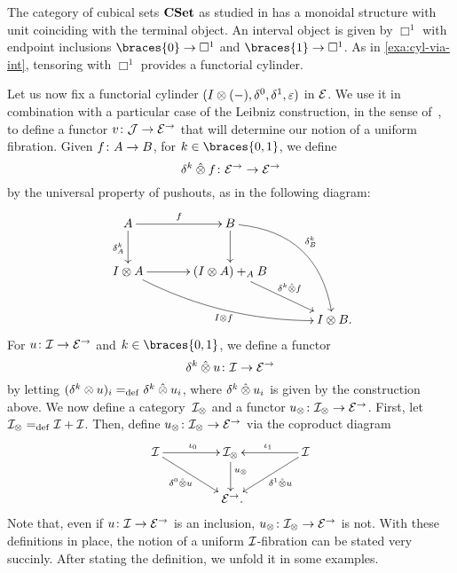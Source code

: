 \documentclass[reqno,10pt,a4paper,oneside,draft]{amsart}
\begin{document}
\begin{example} \label{exa:cyl-in-cuset}
The category of cubical sets $\CSet$ as studied in  has a monoidal structure with unit coinciding with the terminal object.
An interval object is given by $\Box^1$ with endpoint inclusions $\braces{0} \to \Box^1$ and $\braces{1} \to \Box^1$.
As in \cref{exa:cyl-via-int}, tensoring with $\Box^1$ provides a functorial cylinder.
\end{example}

Let us now fix a functorial cylinder $(\interval \otimes (-), \lcyl, \rcyl, \ccyl)$ in $\calE$.
We use it in combination with a particular case of the Leibniz construction, in the sense of~\cite{riehl-verity:reedy}, to define a functor $v \co \cal{J} \to \catE^\to$ that will determine our notion of a uniform fibration.
Given $f \co A \to B$, for $k \in \braces{0, 1}$, we define
\[
  \delta^k \hatotimes f \co \catE^\to \to \catE^\to
\]
by the universal property of pushouts, as in the following diagram:
\begin{gather*}
\xymatrix@C=1.2cm{
  A \ar[r]^{f} \ar[d]_{\kcyl_{A}} & B \ar@/^2pc/[ddr]^{\kcyl_{B}} \ar[d] & \\
  \interval \otimes A \ar@/_1pc/[drr]_{\interval \otimes f} \ar[r] & (\interval \otimes A) +_{A} B \ar[dr]^-{\delta^k \hatotimes f} & \\
  & & \interval \otimes B
\rlap{.}}
\end{gather*}
For $u \co \cal{I} \to \catE^\to$ and $k \in \braces{0, 1}$, we define a functor
\[
  \kcyl \hatotimes u \co \cal{I} \to \catE^\to
\]
by letting $(\kcyl \otimes u)_i \defeq \kcyl \hatotimes u_i$, where $\kcyl \hatotimes u_i$ is given by the construction above.
We now define a category~$\cal{I}_\otimes$ and a functor $u_\otimes \co \cal{I}_\otimes \to \catE^\to$.
First, let $\cal{I}_\otimes \defeq \cal{I} + \cal{I}$.
Then, define $u_\otimes \co \cal{I}_\otimes \to \catE^\to$ via the coproduct diagram
\begin{equation*}
\xymatrix@C+2em{
  \cal{I} \ar[r]^{\iota_0} \ar[dr]_-{\lcyl \hatotimes u} & \cal{I}_\otimes \ar[d]^(.4){u_\otimes} & \cal{I} \ar[dl]^-{\rcyl \hatotimes u} \ar[l]_{\iota_1} \\
  & \catE^\to
\rlap{.}}
\end{equation*}
Note that, even if $u \co \cal{I} \to \catE^\to$ is an inclusion, $u_\otimes \co \cal{I}_\otimes \to \catE^\to$ is not.
With these definitions in place, the notion of a uniform $\cal{I}$-fibration can be stated very succinly.
After stating the definition, we unfold it in some examples.
\end{document}
